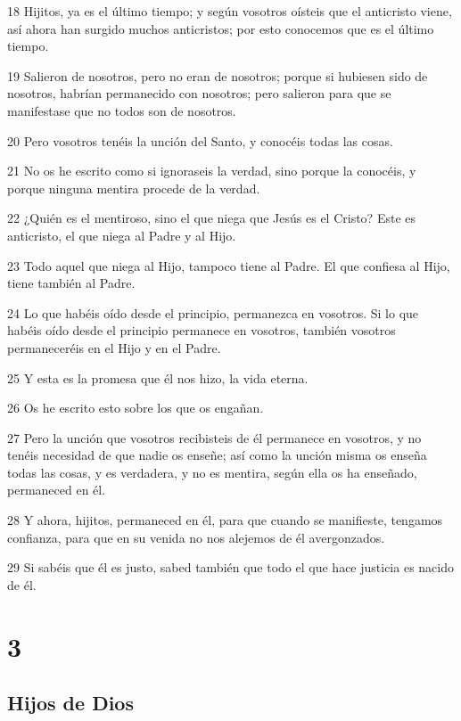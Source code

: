 \par 18 Hijitos, ya es el último tiempo; y según vosotros oísteis que el anticristo viene, así ahora han surgido muchos anticristos; por esto conocemos que es el último tiempo.
\par 19 Salieron de nosotros, pero no eran de nosotros; porque si hubiesen sido de nosotros, habrían permanecido con nosotros; pero salieron para que se manifestase que no todos son de nosotros.
\par 20 Pero vosotros tenéis la unción del Santo, y conocéis todas las cosas.
\par 21 No os he escrito como si ignoraseis la verdad, sino porque la conocéis, y porque ninguna mentira procede de la verdad.
\par 22 ¿Quién es el mentiroso, sino el que niega que Jesús es el Cristo? Este es anticristo, el que niega al Padre y al Hijo.
\par 23 Todo aquel que niega al Hijo, tampoco tiene al Padre. El que confiesa al Hijo, tiene también al Padre.
\par 24 Lo que habéis oído desde el principio, permanezca en vosotros. Si lo que habéis oído desde el principio permanece en vosotros, también vosotros permaneceréis en el Hijo y en el Padre.
\par 25 Y esta es la promesa que él nos hizo, la vida eterna.
\par 26 Os he escrito esto sobre los que os engañan.
\par 27 Pero la unción que vosotros recibisteis de él permanece en vosotros, y no tenéis necesidad de que nadie os enseñe; así como la unción misma os enseña todas las cosas, y es verdadera, y no es mentira, según ella os ha enseñado, permaneced en él.
\par 28 Y ahora, hijitos, permaneced en él, para que cuando se manifieste, tengamos confianza, para que en su venida no nos alejemos de él avergonzados.
\par 29 Si sabéis que él es justo, sabed también que todo el que hace justicia es nacido de él.

\chapter{3}

\section*{Hijos de Dios}

